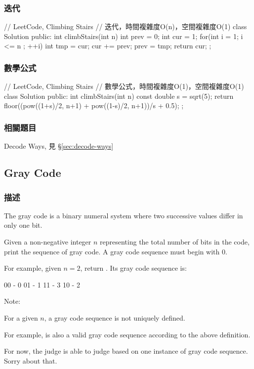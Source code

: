\subsubsection{迭代}
\begin{Code}
// LeetCode, Climbing Stairs
// 迭代，時間複雜度O(n)，空間複雜度O(1)
class Solution {
public:
    int climbStairs(int n) {
        int prev = 0;
        int cur = 1;
        for(int i = 1; i <= n ; ++i){
            int tmp = cur;
            cur += prev;
            prev = tmp;
        }
        return cur;
    }
};
\end{Code}


\subsubsection{數學公式}
\begin{Code}
// LeetCode, Climbing Stairs
// 數學公式，時間複雜度O(1)，空間複雜度O(1)
class Solution {
    public:
    int climbStairs(int n) {
        const double s = sqrt(5);
        return floor((pow((1+s)/2, n+1) + pow((1-s)/2, n+1))/s + 0.5);
    }
};
\end{Code}


\subsubsection{相關題目}
\begindot
\item Decode Ways, 見 \S \ref{sec:decode-ways}
\myenddot


\subsection{Gray Code} %
\label{sec:gray-code}


\subsubsection{描述}
The gray code is a binary numeral system where two successive values differ in only one bit.

Given a non-negative integer $n$ representing the total number of bits in the code, print the sequence of gray code. A gray code sequence must begin with 0.

For example, given $n = 2$, return \fn{[0,1,3,2]}. Its gray code sequence is:
\begin{Code}
00 - 0
01 - 1
11 - 3
10 - 2
\end{Code}

Note:
\begindot
\item For a given $n$, a gray code sequence is not uniquely defined.
\item For example, \fn{[0,2,3,1]} is also a valid gray code sequence according to the above definition.
\item For now, the judge is able to judge based on one instance of gray code sequence. Sorry about that.
\myenddot


